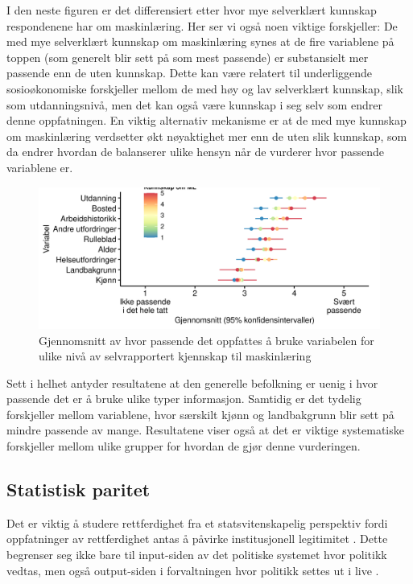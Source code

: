 \documentclass[
  12pt,
  a4paper, 12pt]{article}
\begin{document}
I den neste figuren er det differensiert etter hvor mye selverklært kunnskap respondenene har om maskinlæring. Her ser vi også noen viktige forskjeller: De med mye selverklært kunnskap om maskinlæring synes at de fire variablene på toppen (som generelt blir sett på som mest passende) er substansielt mer passende enn de uten kunnskap. Dette kan være relatert til underliggende sosioøkonomiske forskjeller mellom de med høy og lav selverklært kunnskap, slik som utdanningsnivå, men det kan også være kunnskap i seg selv som endrer denne oppfatningen. En viktig alternativ mekanisme er at de med mye kunnskap om maskinlæring verdsetter økt nøyaktighet mer enn de uten slik kunnskap, som da endrer hvordan de balanserer ulike hensyn når de vurderer hvor passende variablene er.

\begin{figure}

{\centering \includegraphics[width=0.9\linewidth]{figs/png/fig_vars_avg_ml_know} 

}

\caption{Gjennomsnitt av hvor passende det oppfattes å bruke variabelen for ulike nivå av selvrapportert kjennskap til maskinlæring}\label{fig:unnamed-chunk-28}
\end{figure}

Sett i helhet antyder resultatene at den generelle befolkning er uenig i hvor passende det er å bruke ulike typer informasjon. Samtidig er det tydelig forskjeller mellom variablene, hvor særskilt kjønn og landbakgrunn blir sett på mindre passende av mange. Resultatene viser også at det er viktige systematiske forskjeller mellom ulike grupper for hvordan de gjør denne vurderingen.

\hypertarget{paritet}{%
\subsection{Statistisk paritet}\label{paritet}}

Det er viktig å studere rettferdighet fra et statsvitenskapelig perspektiv fordi oppfatninger av rettferdighet antas å påvirke institusjonell legitimitet \citep{tyler2003procedural}.
Dette begrenser seg ikke bare til input-siden av det politiske systemet hvor politikk vedtas, men også output-siden i forvaltningen hvor politikk settes ut i live \citep{krislov2012representative, rosanvallon2011democratic, rothstein2009creating}.
\end{document}
